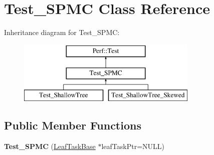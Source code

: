 \hypertarget{classTest__SPMC}{}\section{Test\+\_\+\+S\+P\+M\+C Class Reference}
\label{classTest__SPMC}
Inheritance diagram for Test\+\_\+\+S\+P\+M\+C\+:\begin{figure}[H]
\begin{center}
\leavevmode
\includegraphics[height=3.000000cm]{classTest__SPMC}
\end{center}
\end{figure}
\subsection*{Public Member Functions}
\begin{DoxyCompactItemize}
\item 
\hypertarget{classTest__SPMC_a215c69171318ee10042be18999a36213}{}{\bfseries Test\+\_\+\+S\+P\+M\+C} (\hyperlink{classLeafTaskBase}{Leaf\+Task\+Base} $\ast$leaf\+Task\+Ptr=N\+U\+L\+L)\label{classTest__SPMC_a215c69171318ee10042be18999a36213}

\end{DoxyCompactItemize}
